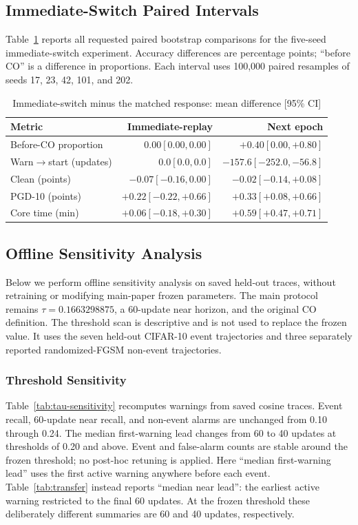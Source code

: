 \subsection{Immediate-Switch Paired Intervals}
Table~\ref{tab:no-replay-ci} reports all requested paired bootstrap comparisons
for the five-seed immediate-switch experiment. Accuracy differences are percentage
points; ``before CO'' is a difference in proportions. Each interval uses
100,000 paired resamples of seeds 17, 23, 42, 101, and 202.

\begin{table}[h]
\centering
\caption{Immediate-switch minus the matched response: mean difference [95\% CI]}
\label{tab:no-replay-ci}
\scriptsize
\setlength{\tabcolsep}{3pt}
\begin{tabular}{lrr}
\toprule
Metric & Immediate-replay & Next epoch \\
\midrule
Before-CO proportion & $0.00[0.00,0.00]$ & $+0.40[0.00,+0.80]$ \\
Warn$\to$start (updates) & $0.0[0.0,0.0]$ & $-157.6[-252.0,-56.8]$ \\
Clean (points) & $-0.07[-0.16,0.00]$ & $-0.02[-0.14,+0.08]$ \\
PGD-10 (points) & $+0.22[-0.22,+0.66]$ & $+0.33[+0.08,+0.66]$ \\
Core time (min) & $+0.06[-0.18,+0.30]$ & $+0.59[+0.47,+0.71]$ \\
\bottomrule
\end{tabular}
\end{table}

\subsection{Offline Sensitivity Analysis}
Below we perform offline sensitivity analysis on saved held-out traces, without
retraining or modifying main-paper frozen parameters. The main protocol remains
$\tau=0.1663298875$, a 60-update near horizon, and the original CO definition.
The threshold scan is descriptive and is not used to replace the frozen value.
It uses the seven held-out CIFAR-10 event trajectories and three separately
reported randomized-FGSM non-event trajectories.

\subsubsection{Threshold Sensitivity}
Table~\ref{tab:tau-sensitivity} recomputes warnings from saved cosine traces.
Event recall, 60-update near recall, and non-event alarms are unchanged from
0.10 through 0.24. The median first-warning lead changes from 60 to 40 updates
at thresholds of 0.20 and above. Event and false-alarm counts are stable around
the frozen threshold; no post-hoc retuning is applied.
Here ``median first-warning lead'' uses the first active warning anywhere
before each event. Table~\ref{tab:transfer} instead reports ``median near lead'':
the earliest active warning restricted to the final 60 updates. At the frozen
threshold these deliberately different summaries are 60 and 40 updates,
respectively.

